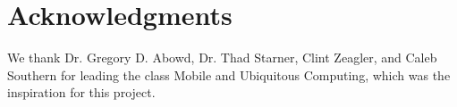 \documentclass{sigchi}
\begin{document}
\section{Acknowledgments}

We thank Dr. Gregory D. Abowd, Dr. Thad Starner, Clint Zeagler, and Caleb Southern for leading the class Mobile and Ubiquitous Computing, which was the inspiration for this project.

%
%
%
%
%
\balance

%
%
\end{document}
